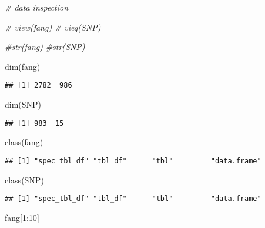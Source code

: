 \documentclass[
]{article}
\newenvironment{Shaded}{\begin{snugshade}}{\end{snugshade}}
\newcommand{\CommentTok}[1]{\textcolor[rgb]{0.56,0.35,0.01}{\textit{#1}}}
\newcommand{\DecValTok}[1]{\textcolor[rgb]{0.00,0.00,0.81}{#1}}
\newcommand{\FunctionTok}[1]{\textcolor[rgb]{0.00,0.00,0.00}{#1}}
\newcommand{\NormalTok}[1]{#1}
\newcommand{\SpecialCharTok}[1]{\textcolor[rgb]{0.00,0.00,0.00}{#1}}
\begin{document}
\begin{Shaded}
\begin{Highlighting}[]
\CommentTok{\# data inspection}

\CommentTok{\# view(fang)}
\CommentTok{\# vieq(SNP)}

\CommentTok{\#str(fang)}
\CommentTok{\#str(SNP)}

\FunctionTok{dim}\NormalTok{(fang)}
\end{Highlighting}
\end{Shaded}

\begin{verbatim}
## [1] 2782  986
\end{verbatim}

\begin{Shaded}
\begin{Highlighting}[]
\FunctionTok{dim}\NormalTok{(SNP)}
\end{Highlighting}
\end{Shaded}

\begin{verbatim}
## [1] 983  15
\end{verbatim}

\begin{Shaded}
\begin{Highlighting}[]
\FunctionTok{class}\NormalTok{(fang)}
\end{Highlighting}
\end{Shaded}

\begin{verbatim}
## [1] "spec_tbl_df" "tbl_df"      "tbl"         "data.frame"
\end{verbatim}

\begin{Shaded}
\begin{Highlighting}[]
\FunctionTok{class}\NormalTok{(SNP)}
\end{Highlighting}
\end{Shaded}

\begin{verbatim}
## [1] "spec_tbl_df" "tbl_df"      "tbl"         "data.frame"
\end{verbatim}

\begin{Shaded}
\begin{Highlighting}[]
\NormalTok{fang[}\DecValTok{1}\SpecialCharTok{:}\DecValTok{10}\NormalTok{]}
\end{Highlighting}
\end{Shaded}
\end{document}

